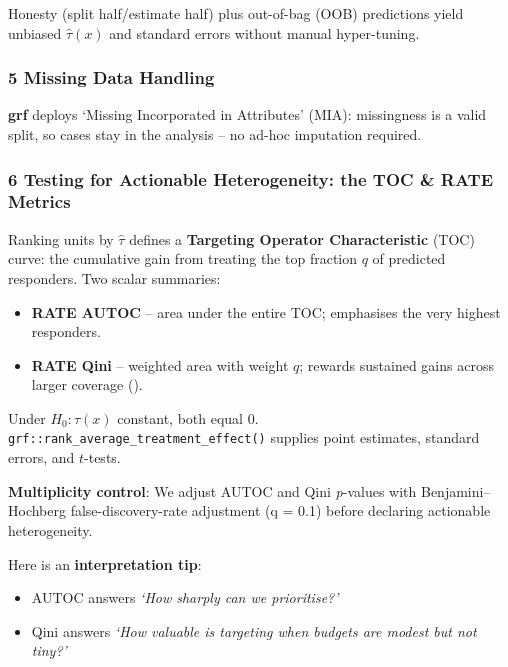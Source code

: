 \documentclass[
  single column]{article}
\providecommand{\tightlist}{%
  \setlength{\itemsep}{0pt}\setlength{\parskip}{0pt}}
\begin{document}
Honesty (split half/estimate half) plus out-of-bag (OOB) predictions
yield unbiased \(\widehat{\tau}(x)\) and standard errors without manual
hyper-tuning.

\subsubsection{5 Missing Data Handling}\label{missing-data-handling}

\textbf{grf} deploys `Missing Incorporated in Attributes' (MIA):
missingness is a valid split, so cases stay in the analysis -- no ad-hoc
imputation required.

\subsubsection{\texorpdfstring{6 Testing for \textbf{Actionable}
Heterogeneity: the TOC \& RATE
Metrics}{6 Testing for Actionable Heterogeneity: the TOC \& RATE Metrics}}\label{testing-for-actionable-heterogeneity-the-toc-rate-metrics}

Ranking units by \(\widehat{\tau}\) defines a \textbf{Targeting Operator
Characteristic} (TOC) curve: the cumulative gain from treating the top
fraction \(q\) of predicted responders. Two scalar summaries:

\begin{itemize}
\tightlist
\item
  \textbf{RATE AUTOC} -- area under the entire TOC; emphasises the very
  highest responders.
\item
  \textbf{RATE Qini} -- weighted area with weight \(q\); rewards
  sustained gains across larger coverage
  ().
\end{itemize}

Under \(H_0{:}\tau(x)\) constant, both equal 0.
\texttt{grf::rank\_average\_treatment\_effect()} supplies point
estimates, standard errors, and \(t\)-tests.

\textbf{Multiplicity control}: We adjust AUTOC and Qini \emph{p}-values
with Benjamini--Hochberg false-discovery-rate adjustment (q = 0.1)
before declaring actionable heterogeneity.

Here is an \textbf{interpretation tip}:

\begin{itemize}
\tightlist
\item
  AUTOC answers \emph{`How sharply can we prioritise?'}
\item
  Qini answers \emph{`How valuable is targeting when budgets are modest
  but not tiny?'}
\end{itemize}
\end{document}
